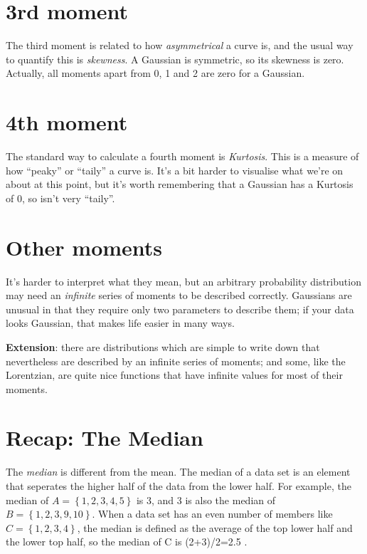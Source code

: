 \documentclass[
  letterpaper,
  DIV=11,
  numbers=noendperiod]{scrreprt}
\begin{document}
\hypertarget{rd-moment}{%
\section{3rd moment}\label{rd-moment}}

The third moment is related to how \emph{asymmetrical} a curve is, and
the usual way to quantify this is \emph{skewness}. A Gaussian is
symmetric, so its skewness is zero. Actually, all moments apart from 0,
1 and 2 are zero for a Gaussian.

\hypertarget{th-moment-1}{%
\section{4th moment}\label{th-moment-1}}

The standard way to calculate a fourth moment is \emph{Kurtosis}. This
is a measure of how ``peaky'' or ``taily'' a curve is. It's a bit harder
to visualise what we're on about at this point, but it's worth
remembering that a Gaussian has a Kurtosis of 0, so isn't very
``taily''.

\hypertarget{other-moments}{%
\section{Other moments}\label{other-moments}}

It's harder to interpret what they mean, but an arbitrary probability
distribution may need an \emph{infinite} series of moments to be
described correctly. Gaussians are unusual in that they require only two
parameters to describe them; if your data looks Gaussian, that makes
life easier in many ways.

\textbf{Extension}: there are distributions which are simple to write
down that nevertheless are described by an infinite series of moments;
and some, like the Lorentzian, are quite nice functions that have
infinite values for most of their moments.

\hypertarget{recap-the-median}{%
\section{Recap: The Median}\label{recap-the-median}}

The \emph{median} is different from the mean. The median of a data set
is an element that seperates the higher half of the data from the lower
half. For example, the median of \(A = \left \{1,2,3,4,5\right \}\) is
3, and 3 is also the median of \(B = \left \{1,2,3,9,10\right \}\). When
a data set has an even number of members like
\(C = \left \{1,2,3,4\right \}\), the median is defined as the average
of the top lower half and the lower top half, so the median of C is
(2+3)/2=2.5 .
\end{document}
